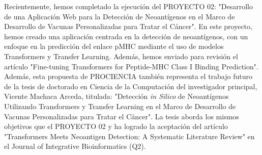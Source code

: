 \documentclass[a4paper,11pt]{article}
\begin{document}

Recientemente, hemos completado la ejecución del PROYECTO 02: "Desarrollo de una Aplicación Web para la Detección de Neoantígenos en el Marco de Desarrollo de Vacunas Personalizadas para Tratar el Cáncer". En este proyecto, hemos creado una aplicación centrada en la detección de neoantígenos, con un enfoque en la predicción del enlace pMHC mediante el uso de modelos Transformers y Transfer Learning. Además, hemos enviado para revisión el artículo "Fine-tuning Transformers for Peptide-MHC Class I Binding Prediction". Además, esta propuesta de PROCIENCIA también representa el trabajo futuro de la tesis de doctorado en Ciencia de la Computación del investigador principal, Vicente Machaca Arceda, titulada: "Detección \textit{in Silico} de Neoantígenos Utilizando Transformers y Transfer Learning en el Marco de Desarrollo de Vacunas Personalizadas para Tratar el Cáncer". La tesis aborda los mismos objetivos que el PROYECTO 02 y ha logrado la aceptación del artículo "Transformers Meets Neoantigen Detection: A Systematic Literature Review" en el Journal of Integrative Bioinformatics (Q2).
\end{document}
